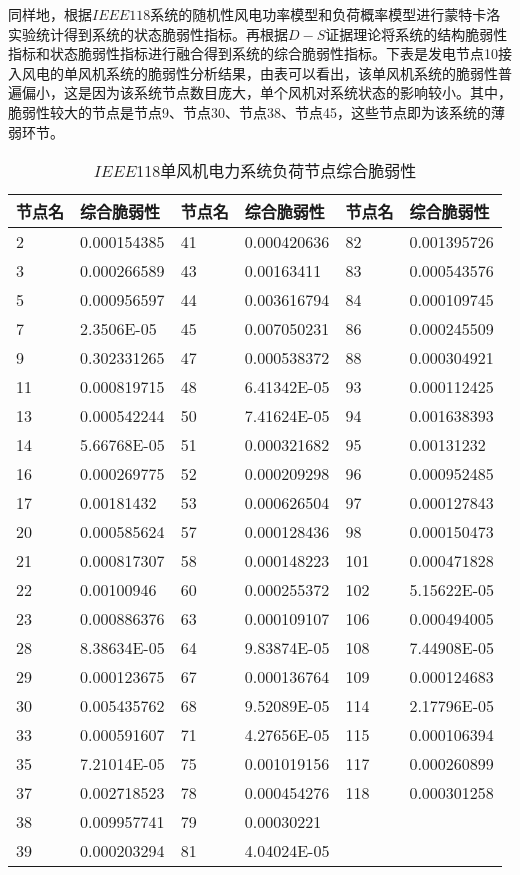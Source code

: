 同样地，根据$IEEE118$系统的随机性风电功率模型和负荷概率模型进行蒙特卡洛实验统计得到系统的状态脆弱性指标。再根据$D-S$证据理论将系统的结构脆弱性指标和状态脆弱性指标进行融合得到系统的综合脆弱性指标。下表是发电节点10接入风电的单风机系统的脆弱性分析结果，由表可以看出，该单风机系统的脆弱性普遍偏小，这是因为该系统节点数目庞大，单个风机对系统状态的影响较小。其中，脆弱性较大的节点是节点9、节点30、节点38、节点45，这些节点即为该系统的薄弱环节。
\begin{table}[H]
\centering
\caption{$IEEE$118单风机电力系统负荷节点综合脆弱性}
\label{tab:chap5:generator118}
\begin{tabular}{C{1.4cm}C{2.2cm}C{1.4cm}C{2.2cm}C{1.4cm}C{2.2cm}}
\toprule
\textbf{节点名} & \textbf{综合脆弱性} & \textbf{节点名} & \textbf{综合脆弱性} & \textbf{节点名} & \textbf{综合脆弱性} \\
   & 0.000154385 & 41  & 0.000420636 & 82  & 0.001395726 \\
3   & 0.000266589 & 43  & 0.00163411  & 83  & 0.000543576 \\
5   & 0.000956597 & 44  & 0.003616794 & 84  & 0.000109745 \\
7   & 2.3506E-05  & 45  & 0.007050231 & 86  & 0.000245509 \\
9   & 0.302331265 & 47  & 0.000538372 & 88  & 0.000304921 \\
11  & 0.000819715 & 48  & 6.41342E-05 & 93  & 0.000112425 \\
13  & 0.000542244 & 50  & 7.41624E-05 & 94  & 0.001638393 \\
14  & 5.66768E-05 & 51  & 0.000321682 & 95  & 0.00131232  \\
16  & 0.000269775 & 52  & 0.000209298 & 96  & 0.000952485 \\
17  & 0.00181432  & 53  & 0.000626504 & 97  & 0.000127843 \\
20  & 0.000585624 & 57  & 0.000128436 & 98  & 0.000150473 \\
21  & 0.000817307 & 58  & 0.000148223 & 101 & 0.000471828 \\
22  & 0.00100946  & 60  & 0.000255372 & 102 & 5.15622E-05 \\
23  & 0.000886376 & 63  & 0.000109107 & 106 & 0.000494005 \\
28  & 8.38634E-05 & 64  & 9.83874E-05 & 108 & 7.44908E-05 \\
29  & 0.000123675 & 67  & 0.000136764 & 109 & 0.000124683 \\
30  & 0.005435762 & 68  & 9.52089E-05 & 114 & 2.17796E-05 \\
33  & 0.000591607 & 71  & 4.27656E-05 & 115 & 0.000106394 \\
35  & 7.21014E-05 & 75  & 0.001019156 & 117 & 0.000260899 \\
37  & 0.002718523 & 78  & 0.000454276 & 118 & 0.000301258 \\
38  & 0.009957741 & 79  & 0.00030221  &     &             \\
39  & 0.000203294 & 81  & 4.04024E-05 &     & \\
\bottomrule
\end{tabular}
\end{table}
